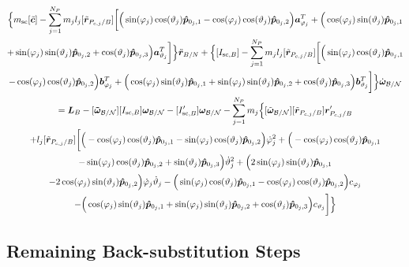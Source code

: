 \documentclass[]{BasiliskReportMemo}
\begin{document}
\begin{multline}
	\Big\{m_{\text{sc}}[\tilde{\bm{c}}] - \sum\limits_{j=1}^{N_P}m_j l_j [\tilde{\bm{r}}_{P_{c,j}/B}] \bigg[
	\Big(\sin(\varphi_j)\cos(\vartheta_j)\bm{\hat{p}}_{0_j,1}-\cos(\varphi_j)\cos(\vartheta_j)\bm{\hat{p}}_{0_j,2}\Big)\bm a_{\varphi_j}^T
	+\Big(\cos(\varphi_j)\sin(\vartheta_j)\bm{\hat{p}}_{0_j,1}\\+\sin(\varphi_j)\sin(\vartheta_j)\bm{\hat{p}}_{0_j,2}+\cos(\vartheta_j)\bm{\hat{p}}_{0_j,3} \Big)\bm a_{\vartheta_j}^T
	\bigg]
	\Big\}\ddot{\bm r}_{B/N}
	+\Big\{[I_{\text{sc},B}] - \sum\limits_{j=1}^{N_P}m_j l_j [\tilde{\bm{r}}_{P_{c,j}/B}] \bigg[
	\Big(\sin(\varphi_j)\cos(\vartheta_j)\bm{\hat{p}}_{0_j,1}\\-\cos(\varphi_j)\cos(\vartheta_j)\bm{\hat{p}}_{0_j,2}\Big)\bm b_{\varphi_j}^T
	+\Big(\cos(\varphi_j)\sin(\vartheta_j)\bm{\hat{p}}_{0_j,1}
	+\sin(\varphi_j)\sin(\vartheta_j)\bm{\hat{p}}_{0_j,2}+\cos(\vartheta_j)\bm{\hat{p}}_{0_j,3} \Big)\bm b_{\vartheta_j}^T
	\bigg]
	\Big\}\dot{\bm\omega}_{\cal B/N}
	\\= 
	\bm{L}_B-[\bm{\tilde{\omega}}_{\cal B/N}] [I_{\text{sc},B}] \bm\omega_{\cal B/N}
	- [I'_{\text{sc},B}] \bm\omega_{\cal B/N}- \sum\limits_{j=1}^{N_P} m_j \Big\{[\tilde{\bm\omega}_{\cal B/N}] [\tilde{\bm{r}}_{P_{c,j}/B}] \bm{r}'_{P_{c,j}/B}
	\\+l_j[\tilde{\bm{r}}_{P_{c,j}/B}]\bigg[
	\Big(-\cos(\varphi_j)\cos(\vartheta_j)\bm{\hat{p}}_{0_j,1}-\sin(\varphi_j)\cos(\vartheta_j)\bm{\hat{p}}_{0_j,2}\Big)\dot{\varphi}_j^2
	+\Big(-\cos(\varphi_j)\cos(\vartheta_j)\bm{\hat{p}}_{0_j,1}\\-\sin(\varphi_j)\cos(\vartheta_j)\bm{\hat{p}}_{0_j,2}+\sin(\vartheta_j)\bm{\hat{p}}_{0_j,3} \Big)\dot{\vartheta}_j^2 +
	\Big(2\sin(\varphi_j)\sin(\vartheta_j)\bm{\hat{p}}_{0_j,1} \\-2\cos(\varphi_j)\sin(\vartheta_j)\bm{\hat{p}}_{0_j,2}\Big)\dot{\varphi}_j\dot{\vartheta}_j
	- \Big(\sin(\varphi_j)\cos(\vartheta_j)\bm{\hat{p}}_{0_j,1} -\cos(\varphi_j)\cos(\vartheta_j)\bm{\hat{p}}_{0_j,2}\Big)c_{\varphi_j} \\-   \Big(\cos(\varphi_j)\sin(\vartheta_j)\bm{\hat{p}}_{0_j,1}+\sin(\varphi_j)\sin(\vartheta_j)\bm{\hat{p}}_{0_j,2}+\cos(\vartheta_j)\bm{\hat{p}}_{0_j,3}\Big) c_{\vartheta_j}
	\bigg]\Big\}
	\label{eq:Final7}
\end{multline}
	
	\subsection{Remaining Back-substitution Steps}
	
\end{document}
